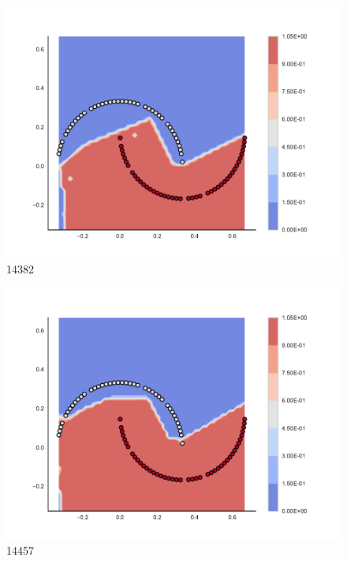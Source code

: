 \begin{subfigure}[b]{0.12\textwidth}
    \includegraphics[clip, trim=2.35cm 1.75cm 4.5cm 0cm,width=\textwidth]{img/convergence/14382.pdf}
    \caption{14382}
    \label{fig:convergence_14382}
\end{subfigure}
%
\begin{subfigure}[b]{0.12\textwidth}
    \includegraphics[clip, trim=2.35cm 1.75cm 4.5cm 0cm,width=\textwidth]{img/convergence/14457.pdf}
    \caption{14457}
    \label{fig:convergence_14457}
\end{subfigure}
%
